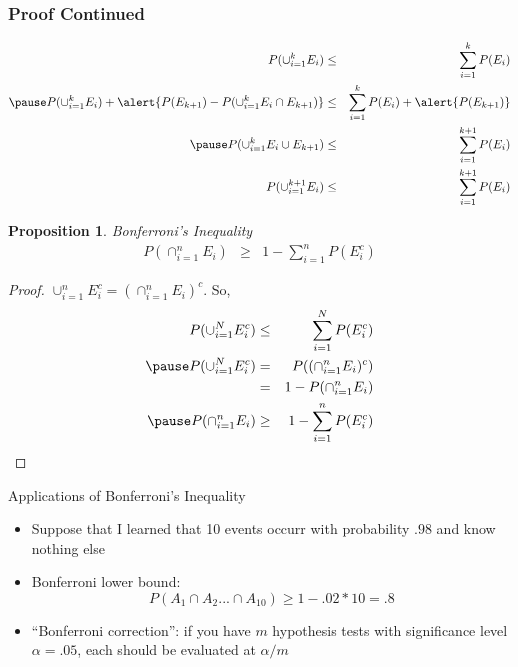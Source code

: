 \documentclass{beamer}
\newtheorem{prop}{Proposition}
\numberwithin{equation}{section}
\begin{document}
\begin{frame}
\frametitle{Proof Continued}

\begin{eqnarray}
P(\cup_{i=1}^{k} E_i ) & \leq  & \sum_{i=1}^{k} P(E_{i} ) \nonumber \\ \pause 
P(\cup_{i=1}^{k} E_i) + \alert{P(E_{k + 1} ) - P(\cup_{i=1}^{k} E_i \cap E_{k + 1})} & \leq & 
\sum_{i=1}^{k} P(E_{i} ) + \alert{P(E_{k + 1} )} \nonumber \\ \pause 
P(\cup_{i=1}^{k } E_i \cup E_{k + 1} ) & \leq & \sum_{i=1}^{k + 1} P(E_{i} )\nonumber \\
P(\cup_{i=1}^{k + 1} E_i) & \leq & \sum_{i=1}^{k + 1} P(E_{i} )\nonumber 
\end{eqnarray}



\end{frame}


\begin{frame}

\begin{prop}
Bonferroni's Inequality
\begin{eqnarray}
P(\cap_{i=1}^{n} E_{i} ) & \geq & 1 - \sum_{i=1}^{n} P(E_{i}^{c} ) \nonumber  
\end{eqnarray}

\end{prop}

\pause 
\begin{proof}
$\cup_{i=1}^{n} E_{i}^{c} = (\cap_{i=1}^{n} E_{i})^c$.  So,  \pause 
\begin{eqnarray}
P(\cup_{i=1}^{N} E_{i}^{c} ) & \leq  & \sum_{i=1}^{N} P(E_{i}^{c} ) \nonumber \\ \pause 
P(\cup_{i=1}^{N} E_{i}^{c} ) & = & P((\cap_{i=1}^{n} E_{i})^c) \nonumber \\
& = & 1 - P(\cap_{i=1}^{n} E_{i}) \nonumber \\ \pause 
P(\cap_{i=1}^{n} E_{i}) & \geq  &  1- \sum_{i=1}^{n} P(E_{i}^{c} )\nonumber 
\end{eqnarray}



\end{proof}

\end{frame}

\begin{frame}{Applications of Bonferroni's Inequality}

\begin{itemize}
\item Suppose that I learned that 10 events occurr with probability $.98$ and know nothing else
\item[] Bonferroni lower bound:
$$P(A_1\cap A_2...\cap A_{10})\geq 1-.02*10=.8$$
\item ``Bonferroni correction'': if you have $m$ hypothesis tests with significance level $\alpha=.05$, each should be evaluated at $\alpha/m$
\end{itemize}
\end{frame}
\end{document}
